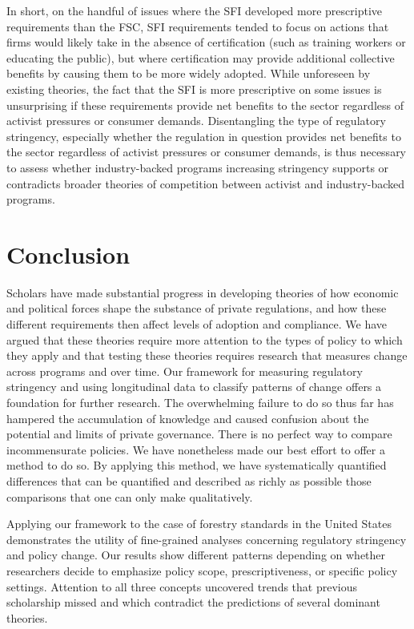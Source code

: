 \documentclass[
      12pt,
            Review ]{article}
\begin{document}
In short, on the handful of issues where the SFI developed more prescriptive requirements than the FSC, SFI requirements tended to focus on actions that firms would likely take in the absence of certification (such as training workers or educating the public), but where certification may provide additional collective benefits by causing them to be more widely adopted. While unforeseen by existing theories, the fact that the SFI is more prescriptive on some issues is unsurprising if these requirements provide net benefits to the sector regardless of activist pressures or consumer demands. Disentangling the type of regulatory stringency, especially whether the regulation in question provides net benefits to the sector regardless of activist pressures or consumer demands, is thus necessary to assess whether industry-backed programs increasing stringency supports or contradicts broader theories of competition between activist and industry-backed programs.

\hypertarget{conclusion}{%
\section{Conclusion}\label{conclusion}}

Scholars have made substantial progress in developing theories of how economic and political forces shape the substance of private regulations, and how these different requirements then affect levels of adoption and compliance. We have argued that these theories require more attention to the types of policy to which they apply and that testing these theories requires research that measures change across programs and over time. Our framework for measuring regulatory stringency and using longitudinal data to classify patterns of change offers a foundation for further research. The overwhelming failure to do so thus far has hampered the accumulation of knowledge and caused confusion about the potential and limits of private governance. There is no perfect way to compare incommensurate policies. We have nonetheless made our best effort to offer a method to do so. By applying this method, we have systematically quantified differences that can be quantified and described as richly as possible those comparisons that one can only make qualitatively.

Applying our framework to the case of forestry standards in the United States demonstrates the utility of fine-grained analyses concerning regulatory stringency and policy change. Our results show different patterns depending on whether researchers decide to emphasize policy scope, prescriptiveness, or specific policy settings. Attention to all three concepts uncovered trends that previous scholarship missed and which contradict the predictions of several dominant theories.
\end{document}
